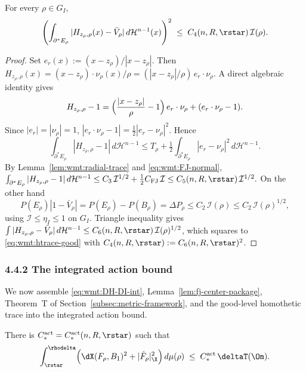 \begin{lemma}\label{lem:wmt:good-htrace}
For every $\rho\in G_I$,
\begin{equation}\label{eq:wmt:htrace-good}
   \Biggl(\int_{\partial^*E_\rho}
       |H_{z_\rho,\rho}(x)-\bar V_\rho|\,
       d\mathcal H^{n-1}(x)\Biggr)^2
   \;\le\; C_4(n,R,\rstar)\,\mathcal I(\rho).
\end{equation}
\end{lemma}

\begin{proof}
Set $e_r(x):=(x-z_\rho)/|x-z_\rho|$. Then
$H_{z_\rho,\rho}(x)
   =(x-z_\rho)\cdot\nu_\rho(x)/\rho
   =(|x-z_\rho|/\rho)\,e_r\cdot\nu_\rho$.
A direct algebraic identity gives
\[
   H_{z_\rho,\rho}-1
   =\Bigl(\frac{|x-z_\rho|}{\rho}-1\Bigr)\,e_r\cdot\nu_\rho
     +(e_r\cdot\nu_\rho-1).
\]
Since $|e_r|=|\nu_\rho|=1$, $|e_r\cdot\nu_\rho-1|
=\tfrac12|e_r-\nu_\rho|^2$. Hence
\[
   \int_{\partial^*E_\rho}|H_{z_\rho,\rho}-1|\,d\mathcal H^{n-1}
   \le T_\rho+\tfrac12\int_{\partial^*E_\rho}|e_r-\nu_\rho|^2\,
       d\mathcal H^{n-1}.
\]
By Lemma~\ref{lem:wmt:radial-trace} and \eqref{eq:wmt:FJ-normal},
\(
   \int_{\partial^*E_\rho}|H_{z_\rho,\rho}-1|\,d\mathcal H^{n-1}
   \le C_3\,\mathcal I^{1/2}+\tfrac12 C_{\mathrm{FJ}}\,\mathcal I
   \le C_5(n,R,\rstar)\,\mathcal I^{1/2}.
\)
On the other hand
\[
   P(E_\rho)|1-\bar V_\rho|
   =P(E_\rho)-P(B_\rho)
   =\Delta P_\rho
   \le C_2\,\mathcal I(\rho)
   \le C_2\,\mathcal I(\rho)^{1/2},
\]
using $\mathcal I\le\eta_I\le 1$ on $G_I$. Triangle inequality gives
$\int|H_{z_\rho,\rho}-\bar V_\rho|\,d\mathcal H^{n-1}
\le C_6(n,R,\rstar)\,\mathcal I(\rho)^{1/2}$, which squares to
\eqref{eq:wmt:htrace-good} with
$C_4(n,R,\rstar):=C_6(n,R,\rstar)^2$.
\end{proof}

\subsubsection{4.4.2 The integrated action bound}
\label{subsec:wmt:integrated-action}

We now assemble \eqref{eq:wmt:DH-DI-int},
Lemma~\ref{lem:fj-center-package}, Theorem~T of
Section~\ref{subsec:metric-framework}, and the good-level homothetic
trace into the integrated action bound.

\begin{theorem}\label{thm:wmt:52int}
There is $C_*^{\mathrm{act}}=C_*^{\mathrm{act}}(n,R,\rstar)$
such that
\begin{equation}\label{eq:wmt:52int}
   \int_{\rstar}^{\rhodelta}
     \Bigl(\dX(F_\rho,B_1)^2+|\dot F_\rho|_{\X}^2\Bigr)\,d\mu(\rho)
   \;\le\; C_*^{\mathrm{act}}\,\deltaT(\Om).
\end{equation}
\end{theorem}

